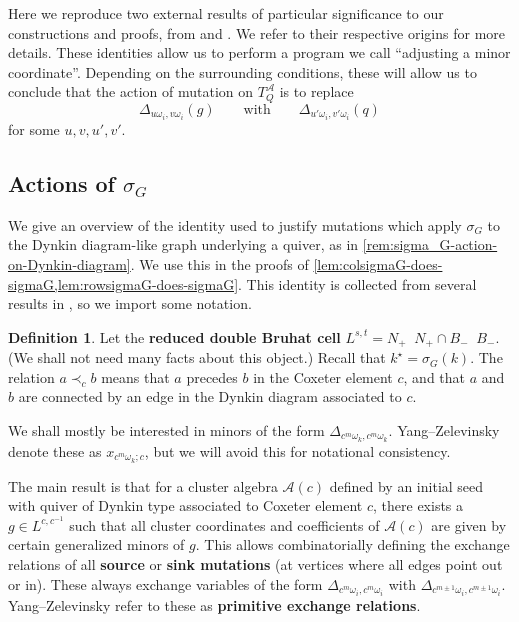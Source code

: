 \documentclass{amsart}
\theoremstyle{plain}
\theoremstyle{definition}
\newtheorem{definition}[theorem]{Definition}
\theoremstyle{remark}
\newcommand{\defined}[1]{\textbf{#1}}
\newcommand{\fundamentalweight}{\omega}
\newcommand{\genminoryz}[3]{\Delta_{{#1} \fundamentalweight_{#3}, {#2}%
    \fundamentalweight_{#3}}}
\newcommand{\lifttoG}[1]{{\mathop{\overline{#1}}}}
\newcommand{\seedAtorus}{T^{\mathcal{A}}}
\begin{document}
  \label{sec:external-results}

  Here we reproduce two external results of particular significance to
  our constructions and proofs, from \cite{yangzelevinsky2008} and
  \cite{fominzelevinsky1999}. We refer to their respective origins for
  more details. These identities allow us to perform a program we call
  ``adjusting a minor coordinate''. Depending on the surrounding
  conditions, these will allow us to conclude that the action of
  mutation on $\seedAtorus_Q$ is to replace \[ \genminoryz{u}{v}{i}(g)
    \qquad \text{with} \qquad \genminoryz{u'}{v'}{i}(q) \] for some $u,
  v, u', v'$.

  \subsection{Actions of \texorpdfstring{$\sigma_G$}{sigma\_G}}

  \label{sec:yz-dynkin-identity}

  We give an overview of the identity used to justify mutations which
  apply $\sigma_G$ to the Dynkin diagram-like graph underlying a quiver,
  as in \cref{rem:sigma_G-action-on-Dynkin-diagram}. We use this in the
  proofs of \cref{lem:colsigmaG-does-sigmaG,lem:rowsigmaG-does-sigmaG}.
  This identity is collected from several results in
  \cite{yangzelevinsky2008}, so we import some notation.

  \begin{definition}
    Let the \defined{reduced double Bruhat cell} $L^{s,t} = N_{+}
    \lifttoG{s} N_{+} \cap B_{-} \lifttoG{t} B_{-}$. (We shall not need
    many facts about this object.) Recall that $k^{\star} =
    \sigma_G(k)$. The relation $a \prec_{c} b$ means that $a$ precedes
    $b$ in the Coxeter element $c$, and that $a$ and $b$ are connected
    by an edge in the Dynkin diagram associated to $c$.
  \end{definition}

  We shall mostly be interested in minors of the form
  $\genminoryz{c^m}{c^m}{k}$. Yang--Zelevinsky denote these as $x_{c^m
    \fundamentalweight_k;c}$, but we will avoid this for notational
  consistency.

  The main result is that for a cluster algebra $\mathcal{A}(c)$ defined
  by an initial seed with quiver of Dynkin type associated to Coxeter
  element $c$, there exists a $g \in L^{c,c^{-1}}$ such that all cluster
  coordinates and coefficients of $\mathcal{A}(c)$ are given by certain
  generalized minors of $g$. This allows combinatorially defining the
  exchange relations of all \defined{source} or \defined{sink mutations}
  (at vertices where all edges point out or in). These always exchange
  variables of the form $\genminoryz{c^m}{c^m}{i}$ with
  $\genminoryz{c^{m \pm 1}}{c^{m \pm 1}}{i}$. Yang--Zelevinsky refer to
  these as \defined{primitive exchange relations}.
\end{document}
